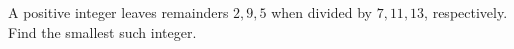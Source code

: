 A positive integer leaves remainders $2,9,5$ when divided by $7,11,13$, respectively. Find the smallest such integer.

